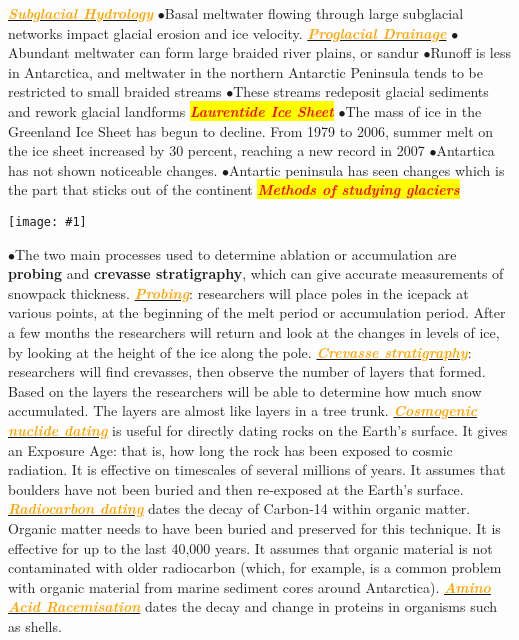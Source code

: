 \documentclass{article}
\newcommand{\ddd}{$\bullet$}
\newcommand{\red}[1]{\textcolor{red}{#1}}
\newcommand{\orange}[1]{\textcolor{orange}{#1}}
\newcommand{\mysection}[1]{\colorbox{yellow}{\textbf{\textit{\red{#1}}}}}
\newcommand{\mysub}[1]{\underline{\textbf{{\textit{\orange{#1}}}}}}
\newcommand{\fig}[1]{
	\texttt{[image: \#1]}
}
\begin{document}
\begin{multicols*}{4}
            \mysub{Subglacial Hydrology}
                \ddd Basal meltwater flowing through large subglacial networks impact glacial erosion and ice velocity. 
            \mysub{Proglacial Drainage}
                \ddd Abundant meltwater can form large braided river plains, or sandur
                \ddd Runoff is less in Antarctica, and meltwater in the northern Antarctic Peninsula tends to be restricted to small braided streams
                \ddd These streams redeposit glacial sediments and rework glacial landforms
        \mysection{Laurentide Ice Sheet}
            \ddd The mass of ice in the Greenland Ice Sheet has begun to decline. From 1979 to 2006, summer melt on the ice sheet increased by 30 percent, reaching a new record in 2007
            \ddd Antartica has not shown noticeable changes. 
            \ddd Antartic peninsula has seen changes which is the part that sticks out of the continent
        \mysection{Methods of studying glaciers}
        \fig{mbMeas}
            \ddd The two main processes used to determine ablation or accumulation are \textbf{probing} and \textbf{crevasse stratigraphy}, which can give accurate measurements of snowpack thickness.
            \mysub{Probing}: researchers will place poles in the icepack at various points, at the beginning of the melt period or accumulation period. After a few months the researchers will return and look at the changes in levels of ice, by looking at the height of the ice along the pole.
            \mysub{Crevasse stratigraphy}: researchers will find crevasses, then observe the number of layers that formed. Based on the layers the researchers will be able to determine how much snow accumulated. The layers are almost like layers in a tree trunk.
            \mysub{Cosmogenic nuclide dating} is useful for directly dating rocks on the Earth’s surface. It gives an Exposure Age: that is, how long the rock has been exposed to cosmic radiation. It is effective on timescales of several millions of years. It assumes that boulders have not been buried and then re-exposed at the Earth’s surface.
            \mysub{Radiocarbon dating} dates the decay of Carbon-14 within organic matter. Organic matter needs to have been buried and preserved for this technique. It is effective for up to the last 40,000 years. It assumes that organic material is not contaminated with older radiocarbon (which, for example, is a common problem with organic material from marine sediment cores around Antarctica).
            \mysub{Amino Acid Racemisation} dates the decay and change in proteins in organisms such as shells.

\end{multicols*}
\end{document}
